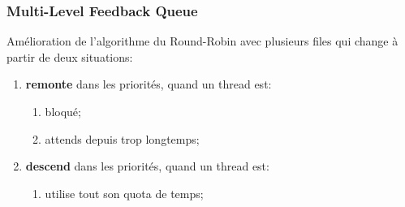 \documentclass{article}
\begin{document}
\subsubsection{Multi-Level Feedback Queue}
\begin{definition}
    Amélioration de l'algorithme du Round-Robin avec plusieurs files qui change à partir de deux situations:
    \begin{enumerate}[noitemsep]
        \item \textbf{remonte} dans les priorités, quand un thread est:
        \begin{enumerate}[noitemsep]
            \item bloqué;
            \item attends depuis trop longtemps;
        \end{enumerate}
        \item \textbf{descend} dans les priorités, quand un thread est:
        \begin{enumerate}[noitemsep]
            \item utilise tout son quota de temps;
        \end{enumerate}
    \end{enumerate}
\end{definition}
\end{document}
